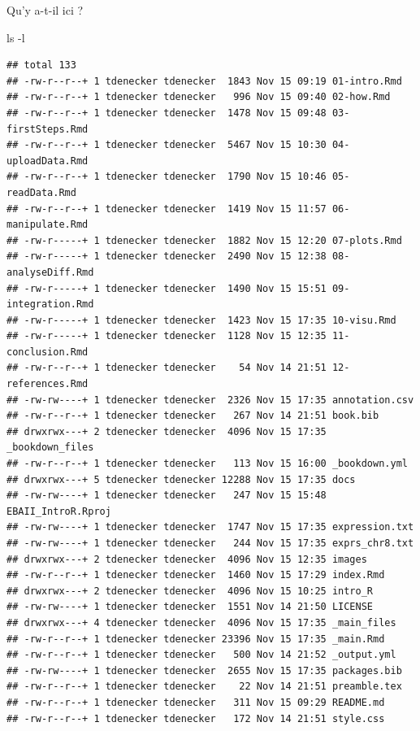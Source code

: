 \documentclass[
]{book}
\newenvironment{Shaded}{\begin{snugshade}}{\end{snugshade}}
\newcommand{\AttributeTok}[1]{\textcolor[rgb]{0.77,0.63,0.00}{#1}}
\newcommand{\FunctionTok}[1]{\textcolor[rgb]{0.00,0.00,0.00}{#1}}
\begin{document}
Qu'y a-t-il ici ?

\begin{Shaded}
\begin{Highlighting}[]
\FunctionTok{ls} \AttributeTok{{-}l}
\end{Highlighting}
\end{Shaded}

\begin{verbatim}
## total 133
## -rw-r--r--+ 1 tdenecker tdenecker  1843 Nov 15 09:19 01-intro.Rmd
## -rw-r--r--+ 1 tdenecker tdenecker   996 Nov 15 09:40 02-how.Rmd
## -rw-r--r--+ 1 tdenecker tdenecker  1478 Nov 15 09:48 03-firstSteps.Rmd
## -rw-r--r--+ 1 tdenecker tdenecker  5467 Nov 15 10:30 04-uploadData.Rmd
## -rw-r--r--+ 1 tdenecker tdenecker  1790 Nov 15 10:46 05-readData.Rmd
## -rw-r--r--+ 1 tdenecker tdenecker  1419 Nov 15 11:57 06-manipulate.Rmd
## -rw-r-----+ 1 tdenecker tdenecker  1882 Nov 15 12:20 07-plots.Rmd
## -rw-r-----+ 1 tdenecker tdenecker  2490 Nov 15 12:38 08-analyseDiff.Rmd
## -rw-r-----+ 1 tdenecker tdenecker  1490 Nov 15 15:51 09-integration.Rmd
## -rw-r-----+ 1 tdenecker tdenecker  1423 Nov 15 17:35 10-visu.Rmd
## -rw-r-----+ 1 tdenecker tdenecker  1128 Nov 15 12:35 11-conclusion.Rmd
## -rw-r--r--+ 1 tdenecker tdenecker    54 Nov 14 21:51 12-references.Rmd
## -rw-rw----+ 1 tdenecker tdenecker  2326 Nov 15 17:35 annotation.csv
## -rw-r--r--+ 1 tdenecker tdenecker   267 Nov 14 21:51 book.bib
## drwxrwx---+ 2 tdenecker tdenecker  4096 Nov 15 17:35 _bookdown_files
## -rw-r--r--+ 1 tdenecker tdenecker   113 Nov 15 16:00 _bookdown.yml
## drwxrwx---+ 5 tdenecker tdenecker 12288 Nov 15 17:35 docs
## -rw-rw----+ 1 tdenecker tdenecker   247 Nov 15 15:48 EBAII_IntroR.Rproj
## -rw-rw----+ 1 tdenecker tdenecker  1747 Nov 15 17:35 expression.txt
## -rw-rw----+ 1 tdenecker tdenecker   244 Nov 15 17:35 exprs_chr8.txt
## drwxrwx---+ 2 tdenecker tdenecker  4096 Nov 15 12:35 images
## -rw-r--r--+ 1 tdenecker tdenecker  1460 Nov 15 17:29 index.Rmd
## drwxrwx---+ 2 tdenecker tdenecker  4096 Nov 15 10:25 intro_R
## -rw-rw----+ 1 tdenecker tdenecker  1551 Nov 14 21:50 LICENSE
## drwxrwx---+ 4 tdenecker tdenecker  4096 Nov 15 17:35 _main_files
## -rw-r--r--+ 1 tdenecker tdenecker 23396 Nov 15 17:35 _main.Rmd
## -rw-r--r--+ 1 tdenecker tdenecker   500 Nov 14 21:52 _output.yml
## -rw-rw----+ 1 tdenecker tdenecker  2655 Nov 15 17:35 packages.bib
## -rw-r--r--+ 1 tdenecker tdenecker    22 Nov 14 21:51 preamble.tex
## -rw-r--r--+ 1 tdenecker tdenecker   311 Nov 15 09:29 README.md
## -rw-r--r--+ 1 tdenecker tdenecker   172 Nov 14 21:51 style.css
\end{verbatim}
\end{document}
